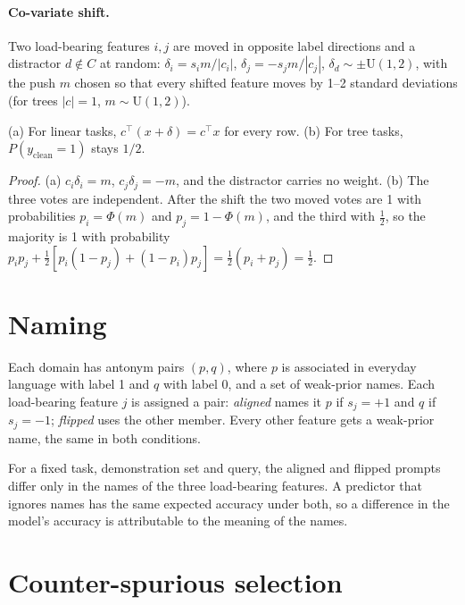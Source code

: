 \paragraph{Co-variate shift.}
Two load-bearing features $i, j$ are moved in opposite label directions and a distractor $d \notin C$ at random:
$\delta_i = s_i m/|c_i|$, $\delta_j = -s_j m/|c_j|$, $\delta_d \sim \pm\mathrm{U}(1,2)$, with the push $m$ chosen so that every shifted feature moves by 1--2 standard deviations (for trees $|c| = 1$, $m \sim \mathrm{U}(1,2)$).

\begin{lemma}
(a) For linear tasks, $c^\top(x + \delta) = c^\top x$ for every row. (b) For tree tasks, $P(y_{\mathrm{clean}} = 1)$ stays $1/2$.
\end{lemma}
\begin{proof}
(a) $c_i\delta_i = m$, $c_j\delta_j = -m$, and the distractor carries no weight. (b) The three votes are independent. After the shift the two moved votes are 1 with probabilities $p_i = \Phi(m)$ and $p_j = 1 - \Phi(m)$, and the third with $\tfrac12$, so the majority is 1 with probability $p_i p_j + \tfrac12[p_i(1-p_j) + (1-p_i)p_j] = \tfrac12(p_i + p_j) = \tfrac12$.
\end{proof}

\section{Naming}

Each domain has antonym pairs $(p, q)$, where $p$ is associated in everyday language with label 1 and $q$ with label 0, and a set of weak-prior names.
Each load-bearing feature $j$ is assigned a pair: \emph{aligned} names it $p$ if $s_j = +1$ and $q$ if $s_j = -1$; \emph{flipped} uses the other member.
Every other feature gets a weak-prior name, the same in both conditions.

\begin{proposition}[Identification]
For a fixed task, demonstration set and query, the aligned and flipped prompts differ only in the names of the three load-bearing features. A predictor that ignores names has the same expected accuracy under both, so a difference in the model's accuracy is attributable to the meaning of the names.
\end{proposition}

\section{Counter-spurious selection}

